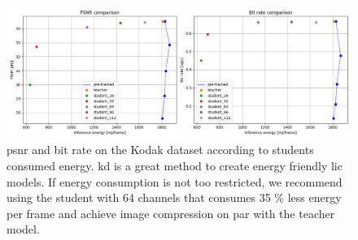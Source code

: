 \documentclass{article}
\begin{document}
\begin{figure}
    \centering
    \includegraphics[width=15cm]{kd_lic_energy.png}
    \caption[\acrshort{psnr} and bit rate on the Kodak dataset according to students consumed energy.]{\acrshort{psnr} and bit rate on the Kodak dataset according to students consumed energy. \acrshort{kd} is a great method to create energy friendly \acrshort{lic} models. If energy consumption is not too restricted, we recommend using the student with 64 channels that consumes 35 \% less energy per frame and achieve image compression on par with the teacher model.}
    \label{kd_lic_energy}
\end{figure}

\end{document}
